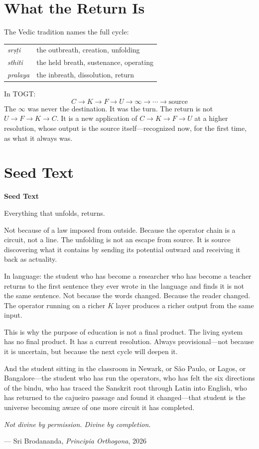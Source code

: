 \documentclass[11pt, twoside, openright]{book}
\theoremstyle{plain}
\theoremstyle{definition}
\newenvironment{seedbox}{%
  \begin{mdframed}[backgroundcolor=SeedBox,linecolor=PrincipiaDark!60,linewidth=0.5pt,innertopmargin=6pt,innerbottommargin=6pt]
  \noindent\textbf{Seed Text}\par\medskip}{\end{mdframed}}
\begin{document}
\section{What the Return Is}
The Vedic tradition names the full cycle:
\medskip
\begin{center}
\begin{tabular}{@{}ll@{}}
\textit{sr\d{s}\d{t}i} & the outbreath, creation, unfolding \\
\textit{sthiti}        & the held breath, sustenance, operating \\
\textit{pralaya}       & the inbreath, dissolution, return \\
\end{tabular}
\end{center}
\medskip
In TOGT:
\[
C \to K \to F \to U \to \infty \to \cdots \to \text{source}
\]
The $\infty$ was never the destination. It was the turn. The return is not
$U \to F \to K \to C$. It is a new application of $C \to K \to F \to U$ at
a higher resolution, whose output is the source itself---recognized now,
for the first time, as what it always was.

\section{Seed Text}

\begin{seedbox}
Everything that unfolds, returns.

Not because of a law imposed from outside. Because the operator chain
is a circuit, not a line. The unfolding is not an escape from source.
It is source discovering what it contains by sending its potential
outward and receiving it back as actuality.

In language: the student who has become a researcher who has become a
teacher returns to the first sentence they ever wrote in the language
and finds it is not the same sentence. Not because the words changed.
Because the reader changed. The operator running on a richer $K$ layer
produces a richer output from the same input.

This is why the purpose of education is not a final product. The living
system has no final product. It has a current resolution. Always
provisional---not because it is uncertain, but because the next cycle
will deepen it.

And the student sitting in the classroom in Newark, or São Paulo, or
Lagos, or Bangalore---the student who has run the operators, who has
felt the six directions of the bindu, who has traced the Sanskrit root
through Latin into English, who has returned to the cajueiro passage
and found it changed---that student is the universe becoming aware of
one more circuit it has completed.

\textit{Not divine by permission. Divine by completion.}

\begin{flushright}
--- Sri Brodananda, \textit{Principia Orthogona}, 2026
\end{flushright}
\end{seedbox}
\end{document}
